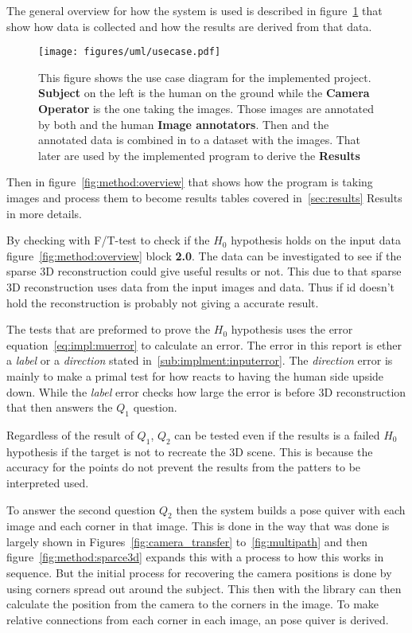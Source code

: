 The general overview for how the system is used is described in figure~\ref{fig:usecase} that show how data is collected and how the results are derived from that data.

\begin{figure}
\begin{center}
    \texttt{[image: figures/uml/usecase.pdf]}
\end{center}
\caption{This figure shows the use case diagram for the implemented project. \textbf{Subject} on the left is the human on the ground while the \textbf{Camera Operator} is the one taking the images.
Those images are annotated by both \openpose{ } and the human \textbf{Image annotators}.
Then \openpose{ } and the annotated data is combined in to a dataset with the images.
That later are used by the implemented program to derive the \textbf{Results}}
\label{fig:usecase}
\end{figure}

Then in figure~\ref{fig:method:overview} that shows how the program is taking images and process them to become results tables covered in~\ref{sec:results} Results in more details.

By checking with F/T-test to check if the $H_0$ hypothesis holds on the input data figure~\ref{fig:method:overview} block \textbf{2.0}.
The data can be investigated to see if the sparse 3D reconstruction could give useful results or not.
This due to that sparse 3D reconstruction uses data from the input images and data.
Thus if id doesn't hold the reconstruction is probably not giving a accurate result.

The tests that are preformed to prove the $H_0$ hypothesis uses the error equation~\ref{eq:impl:muerror} to calculate an error.
The error in this report is ether a \textit{label} or a \textit{direction} stated in~\ref{sub:implment:inputerror}.
The \textit{direction} error is mainly to make a primal test for how \openpose{ } reacts to having the human side upside down.
While the \textit{label} error checks how large the error is before 3D reconstruction that then answers the $Q_1$ question.

Regardless of the result of $Q_1$, $Q_2$  can be tested even if the results is a failed $H_0$ hypothesis if the target is not to recreate the 3D scene.
This is because the accuracy for the points do not prevent the results from the \arcuo{ } patters to be interpreted used.

To answer the second question $Q_2$ then the system builds a pose quiver with each image and each corner in that image.
This is done in the way that was done is largely shown in Figures~\ref{fig:camera_transfer} to~\ref{fig:multipath} and then figure~\ref{fig:method:sparce3d} expands this with a process to how this works in sequence.
But the initial process for recovering the camera positions is done by using \aruco{ } corners spread out around the subject.
This then with the \aruco{ } library can then calculate the position from the camera to the \acuro{ } corners in the image.
To make relative connections from each corner in each image, an pose quiver is derived.

